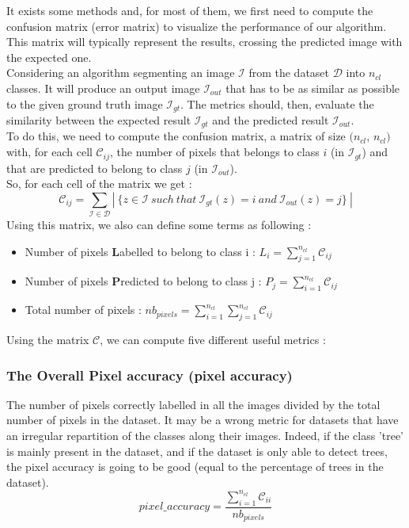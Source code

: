 It exists some methods and, for most of them, we first need to compute the confusion matrix (error matrix) to visualize the performance of our algorithm. This matrix will typically represent the results, crossing the predicted image with the expected one. \\
Considering an algorithm segmenting an image $\mathcal{I}$ from the dataset $\mathcal{D}$ into $n_{cl}$ classes. It will produce an output image $\mathcal{I}_{out}$ that has to be as similar as possible to the given ground truth image $\mathcal{I}_{gt}$. The metrics should, then, evaluate the similarity between the expected result $\mathcal{I}_{gt}$ and the predicted result $\mathcal{I}_{out}$. \\
To do this, we need to compute the confusion matrix, a matrix of size $(n_{cl}$, $n_{cl})$ with, for each cell $\mathcal{C}_{ij}$, the number of pixels that belongs to class $i$ (in $\mathcal{I}_{gt}$) and that are predicted to belong to class $j$ (in $\mathcal{I}_{out}$). \\
So, for each cell of the matrix we get :
$$ \mathcal{C}_{ij} = \sum_{\mathcal{I} \in \mathcal{D}} |\ \{ z \in \mathcal{I}\ such\ that\ \mathcal{I}_{gt}(z) = i\ and\ \mathcal{I}_{out}(z) = j \}\ | $$
Using this matrix, we also can define some terms as following :
\begin{itemize}
\item Number of pixels \textbf{L}abelled to belong to class i : $ L_i = \sum_{j=1}^{n_{cl}} \mathcal{C}_{ij} $
\item Number of pixels \textbf{P}redicted to belong to class j : $ P_j = \sum_{i=1}^{n_{cl}} \mathcal{C}_{ij} $
\item Total number of pixels : $ nb_{pixels} = \sum_{i=1}^{n_{cl}} \sum_{j=1}^{n_{cl}} \mathcal{C}_{ij} $
\end{itemize}

Using the matrix $\mathcal{C}$, we can compute five different useful metrics :
\subsubsection{The Overall Pixel accuracy (pixel accuracy)}
The number of pixels correctly labelled in all the images divided by the total number of pixels in the dataset. It may be a wrong metric for datasets that have an irregular repartition of the classes along their images. Indeed, if the class 'tree' is mainly present in the dataset, and if the dataset is only able to detect trees, the pixel accuracy is going to be good (equal to the percentage of trees in the dataset).
$$ pixel\_accuracy = \frac{\sum_{i=1}^{n_{cl}} \mathcal{C}_{ii}}{nb_{pixels}} $$
